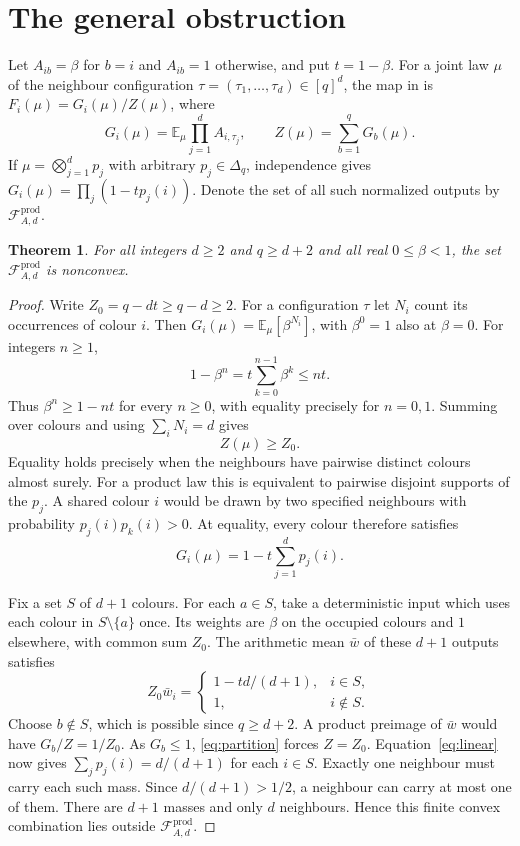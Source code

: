 \documentclass[10pt,reqno]{amsart}
\newtheorem{theorem}{Theorem}
\newcommand{\E}{\mathbb E}
\newcommand{\Fprod}{\mathcal F^{\mathrm{prod}}}
\begin{document}
\section{The general obstruction}

Let $A_{ib}=\beta$ for $b=i$ and $A_{ib}=1$ otherwise, and put $t=1-\beta$.
For a joint law $\mu$ of the neighbour configuration
$\tau=(\tau_1,\ldots,\tau_d)\in[q]^d$, the map in
\cite[eqs.~(1)--(2)]{LMP} is $F_i(\mu)=G_i(\mu)/Z(\mu)$, where
\[
 G_i(\mu)=\E_\mu\prod_{j=1}^d A_{i,\tau_j},
 \qquad Z(\mu)=\sum_{b=1}^q G_b(\mu).
\]
If $\mu=\bigotimes_{j=1}^d p_j$ with arbitrary $p_j\in\Delta_q$, independence
gives $G_i(\mu)=\prod_j(1-tp_j(i))$. Denote the set of all such normalized
outputs by $\Fprod_{A,d}$.

\begin{theorem}\label{thm:main}
For all integers $d\ge2$ and $q\ge d+2$ and all real $0\le\beta<1$,
the set $\Fprod_{A,d}$ is nonconvex.
\end{theorem}

\begin{proof}
Write $Z_0=q-dt\ge q-d\ge2$. For a configuration $\tau$ let $N_i$ count
its occurrences of colour $i$. Then $G_i(\mu)=\E_\mu[\beta^{N_i}]$, with
$\beta^0=1$ also at $\beta=0$. For integers $n\ge1$,
\[
 1-\beta^n=t\sum_{k=0}^{n-1}\beta^k\le nt .
\]
Thus $\beta^n\ge1-nt$ for every $n\ge0$, with equality precisely for
$n=0,1$. Summing over colours and using $\sum_iN_i=d$ gives
\begin{equation}\label{eq:partition}
 Z(\mu)\ge Z_0 .
\end{equation}
Equality holds precisely when the neighbours have pairwise distinct colours
almost surely. For a product law this is equivalent to pairwise disjoint
supports of the $p_j$. A shared colour $i$ would be drawn by two specified
neighbours with probability $p_j(i)p_k(i)>0$. At equality, every colour
therefore satisfies
\begin{equation}\label{eq:linear}
 G_i(\mu)=1-t\sum_{j=1}^d p_j(i).
\end{equation}

Fix a set $S$ of $d+1$ colours. For each $a\in S$, take a deterministic
input which uses each colour in $S\setminus\{a\}$ once. Its weights are
$\beta$ on the occupied colours and $1$ elsewhere, with common sum $Z_0$.
The arithmetic mean $\bar w$ of these $d+1$ outputs satisfies
\[
 Z_0\bar w_i=
 \begin{cases}
  1-td/(d+1),& i\in S,\\
  1,& i\notin S .
 \end{cases}
\]
Choose $b\notin S$, which is possible since $q\ge d+2$. A product preimage
of $\bar w$ would have $G_b/Z=1/Z_0$. As $G_b\le1$, \eqref{eq:partition}
forces $Z=Z_0$. Equation~\eqref{eq:linear} now gives
$\sum_jp_j(i)=d/(d+1)$ for each $i\in S$. Exactly one neighbour must carry
each such mass. Since $d/(d+1)>1/2$, a neighbour can carry at most one of
them. There are $d+1$ masses and only $d$ neighbours. Hence this finite
convex combination lies outside $\Fprod_{A,d}$.
\end{proof}
\end{document}
